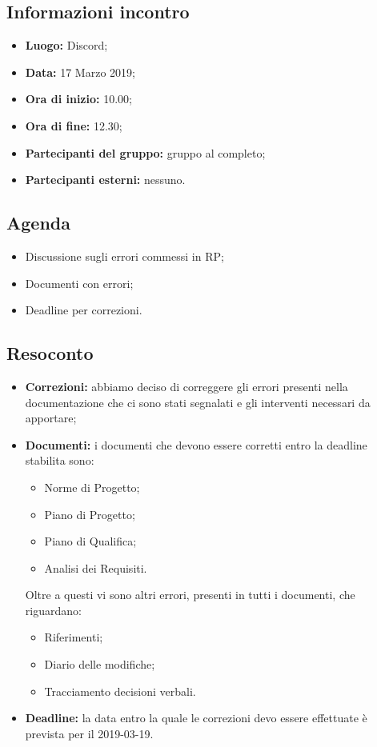 \subsection{Informazioni incontro}
\begin{itemize}
	\item { \textbf{Luogo:} Discord};
	\item { \textbf{Data:} 17 Marzo 2019};
	\item { \textbf{Ora di inizio:} 10.00};
	\item { \textbf{Ora di fine:} 12.30};
	\item { \textbf{Partecipanti del gruppo:} gruppo al completo};
	\item { \textbf{Partecipanti esterni:} nessuno}.
\end{itemize}


\subsection{Agenda}
\begin{itemize}
	\item {Discussione sugli errori commessi in RP;}
	\item {Documenti con errori;}
	\item {Deadline per correzioni.}
\end{itemize}

\subsection{Resoconto}
\begin{itemize}
	\item { \textbf{Correzioni:} abbiamo deciso di correggere gli errori presenti nella documentazione che ci sono stati segnalati e gli interventi necessari da apportare;}
	\item{ \textbf{Documenti:} i documenti che devono essere corretti entro la deadline stabilita sono:
		\begin{itemize}
			\item Norme di Progetto;
			\item Piano di Progetto;
			\item Piano di Qualifica;
			\item Analisi dei Requisiti.
		\end{itemize}}
	Oltre a questi vi sono altri errori, presenti in tutti i documenti, che riguardano:
	\begin{itemize}
		\item Riferimenti;
		\item Diario delle modifiche;
		\item Tracciamento decisioni verbali.
	\end{itemize}
	\item {\textbf{Deadline:} la data entro la quale le correzioni devo essere effettuate è prevista per il 2019-03-19.}
\end{itemize}

